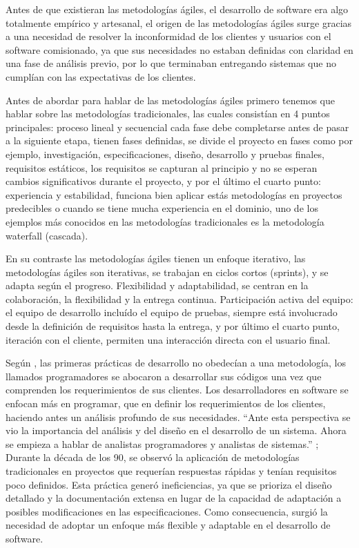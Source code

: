 Antes de que existieran las metodologías ágiles, el desarrollo de software era algo totalmente empírico y artesanal, el origen de las metodologías ágiles surge gracias a una necesidad de resolver la inconformidad de los clientes y usuarios con el software comisionado, ya que sus necesidades no estaban definidas con claridad en una fase de análisis previo, por lo que terminaban entregando sistemas que no cumplían con las expectativas de los clientes.

Antes de abordar para hablar de las metodologías ágiles primero tenemos que hablar sobre
las metodologías tradicionales, las cuales consistían en 4 puntos principales: proceso lineal y secuencial cada fase debe completarse antes de pasar a la siguiente etapa, tienen fases definidas, se divide el proyecto en fases como por ejemplo, investigación, especificaciones, diseño, desarrollo y pruebas finales, requisitos estáticos, los requisitos se capturan al principio y no se esperan cambios significativos durante el proyecto, y por el último el cuarto punto: experiencia y estabilidad, funciona bien aplicar estás metodologías en proyectos predecibles o cuando se tiene mucha experiencia en el dominio, uno de los ejemplos más conocidos en las metodologías tradicionales es la metodología waterfall (cascada).

En su contraste las metodologías ágiles tienen un enfoque iterativo, las metodologías ágiles son iterativas, se trabajan en ciclos cortos (sprints), y se adapta según el progreso. Flexibilidad y adaptabilidad, se centran en la colaboración, la flexibilidad y la entrega continua. Participación activa del equipo: el equipo de desarrollo incluído el equipo de pruebas, siempre está involucrado desde la definición de requisitos hasta la entrega, y por último el cuarto punto, iteración con el cliente, permiten una interacción directa con el usuario final.

Según \cite{Maida2015}, las primeras prácticas de desarrollo no obedecían a una metodología, los llamados programadores se abocaron a desarrollar sus códigos una vez que comprenden los requerimientos de sus clientes. Los desarrolladores en software se enfocan más en programar, que en definir los requerimientos de los clientes, haciendo antes un análisis profundo de sus necesidades. “Ante esta perspectiva se vio la importancia del análisis y del diseño en el desarrollo de un sistema. Ahora se empieza a hablar de analistas programadores y analistas de sistemas.” \cite{Carballar2009}; Durante la década de los 90, se observó la aplicación de metodologías tradicionales en proyectos que requerían respuestas rápidas y tenían requisitos poco definidos. Esta práctica generó ineficiencias, ya que se prioriza el diseño detallado y la documentación extensa en lugar de la capacidad de adaptación a posibles modificaciones en las especificaciones. Como consecuencia, surgió la necesidad de adoptar un enfoque más flexible y adaptable en el desarrollo de software.

